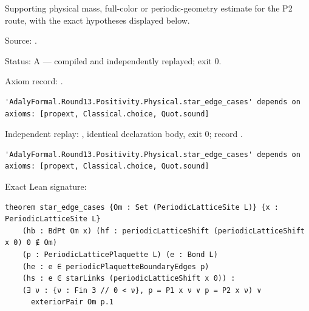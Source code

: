 \begin{theorem}[bp-474]
\label{bp-474}
\leanok
Supporting physical mass, full-color or periodic-geometry estimate for the P2 route, with the exact hypotheses displayed below.

\par Source: \texttt{}.
\par Status: A — compiled and independently replayed; exit 0.
\par Axiom record: \texttt{}.
\begin{verbatim}
'AdalyFormal.Round13.Positivity.Physical.star_edge_cases' depends on axioms: [propext, Classical.choice, Quot.sound]
\end{verbatim}
\par Independent replay: \texttt{}, identical declaration body, exit 0; record \texttt{}.
\begin{verbatim}
'AdalyFormal.Round13.Positivity.Physical.star_edge_cases' depends on axioms: [propext, Classical.choice, Quot.sound]
\end{verbatim}
\par Exact Lean signature:
\begin{verbatim}
theorem star_edge_cases {Om : Set (PeriodicLatticeSite L)} {x : PeriodicLatticeSite L}
    (hb : BdPt Om x) (hf : periodicLatticeShift (periodicLatticeShift x 0) 0 ∉ Om)
    (p : PeriodicLatticePlaquette L) (e : Bond L)
    (he : e ∈ periodicPlaquetteBoundaryEdges p)
    (hs : e ∈ starLinks (periodicLatticeShift x 0)) :
    (∃ ν : {ν : Fin 3 // 0 < ν}, p = P1 x ν ∨ p = P2 x ν) ∨
      exteriorPair Om p.1
\end{verbatim}
\end{theorem}

